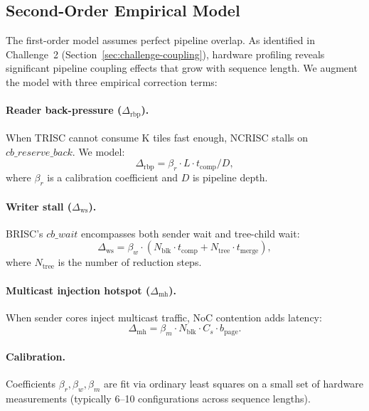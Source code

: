 \documentclass[sigconf, review, anonymous]{acmart}
\begin{document}

\subsection{Second-Order Empirical Model}\label{sec:cm-second}

The first-order model assumes perfect pipeline overlap.  As identified
in Challenge~2 (Section~\ref{sec:challenge-coupling}), hardware
profiling reveals significant pipeline coupling effects that grow with
sequence length.  We augment the model with three empirical correction
terms:

\paragraph{Reader back-pressure ($\Delta_{\mathrm{rbp}}$).}
When TRISC cannot consume K tiles fast enough, NCRISC stalls on
$cb\_reserve\_back$.  We model:
\begin{equation}
  \Delta_{\mathrm{rbp}} = \beta_r \cdot L \cdot t_{\mathrm{comp}} / D ,
\end{equation}
where $\beta_r$ is a calibration coefficient and $D$ is pipeline depth.

\paragraph{Writer stall ($\Delta_{\mathrm{ws}}$).}
BRISC's $cb\_wait$ encompasses both sender wait and tree-child wait:
\begin{equation}
  \Delta_{\mathrm{ws}} = \beta_w \cdot (N_{\mathrm{blk}} \cdot t_{\mathrm{comp}}
    + N_{\mathrm{tree}} \cdot t_{\mathrm{merge}}) ,
\end{equation}
where $N_{\mathrm{tree}}$ is the number of reduction steps.

\paragraph{Multicast injection hotspot ($\Delta_{\mathrm{mh}}$).}
When sender cores inject multicast traffic, NoC contention adds latency:
\begin{equation}
  \Delta_{\mathrm{mh}} = \beta_m \cdot N_{\mathrm{blk}} \cdot C_s \cdot b_{\mathrm{page}} .
\end{equation}

\paragraph{Calibration.}
Coefficients $\beta_r, \beta_w, \beta_m$ are fit via ordinary least
squares on a small set of hardware measurements (typically 6--10
configurations across sequence lengths).
\end{document}
